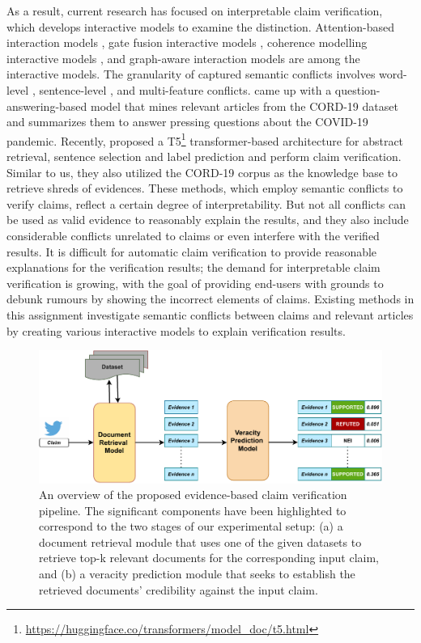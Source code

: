 \documentclass[11pt]{article}
\begin{document}
As a result, current research has focused on interpretable claim verification, which develops interactive models to examine the distinction. Attention-based interaction models \cite{popat2018declare}, gate fusion interactive models \cite{wu2020adaptive}, coherence modelling interactive models \cite{ma2019sentence}, and graph-aware interaction models are among the interactive models.  The granularity of captured semantic conflicts involves word-level \cite{popat2018declare}, sentence-level \cite{ma2019sentence}, and multi-feature \cite{wu2020adaptive} conflicts. \citet{su2020cairecovid} came up with a question-answering-based model that mines relevant articles from the CORD-19 dataset and summarizes them to answer pressing questions about the COVID-19 pandemic. Recently, \citet{pradeep-etal-2021-scientific} proposed a T5\footnote{\url{https://huggingface.co/transformers/model\_doc/t5.html}} transformer-based architecture for abstract retrieval, sentence selection and label prediction and perform claim verification. Similar to us, they also utilized the CORD-19 \cite{wang2020cord19} corpus as the knowledge base to retrieve shreds of evidences. These methods, which employ semantic conflicts to verify claims, reflect a certain degree of interpretability. But not all conflicts can be used as valid evidence to reasonably explain the results, and they also include considerable conflicts unrelated to claims or even interfere with the verified results. It is difficult for automatic claim verification to provide reasonable explanations for the verification results; the demand for interpretable claim verification is growing, with the goal of providing end-users with grounds to debunk rumours by showing the incorrect elements of claims. Existing methods in this assignment investigate semantic conflicts between claims and relevant articles by creating various interactive models to explain verification results. 

\begin{figure}[h]
    \centering
    \includegraphics[width=\textwidth]{model.pdf}
    \caption{An overview of the proposed evidence-based claim verification pipeline. The significant components have been highlighted to correspond to the two stages of our experimental setup: (a) a document retrieval module that uses one of the given datasets to retrieve top-k relevant documents for the corresponding input claim, and (b) a veracity prediction module that seeks to establish the retrieved documents' credibility against the input claim.}
    \label{fig:pipeline}
\end{figure}
\end{document}
